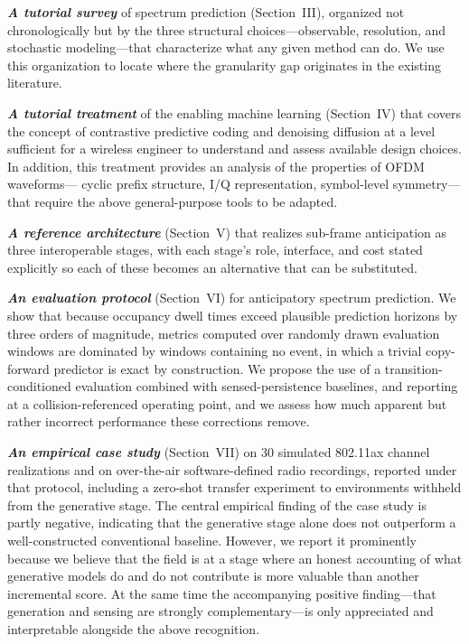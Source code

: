 \documentclass[lettersize,journal]{IEEEtran}
\begin{document}
\textbf{\emph{A tutorial survey}} of spectrum prediction
(Section~III), organized not chronologically but by the three
structural choices---observable, resolution, and stochastic
modeling---that characterize what any given method can do. We use this
organization to locate where the granularity gap originates
in the existing literature.

\textbf{\emph{A tutorial treatment}} of the enabling machine learning
(Section~IV) that covers the concept of contrastive predictive coding 
and denoising
diffusion at a level sufficient for a wireless engineer to understand 
and assess available
design choices. In addition, this treatment provides an analysis 
of the properties of OFDM waveforms---
cyclic prefix structure, I/Q representation, symbol-level
symmetry---that require the above general-purpose tools to be adapted.

\textbf{\emph{A reference architecture}} (Section~V) that realizes
sub-frame anticipation as three interoperable stages, with each stage's
role, interface, and cost stated explicitly so each of these becomes an
alternative that can be substituted.

\textbf{\emph{An evaluation protocol}} (Section~VI) for
anticipatory spectrum prediction. We show that because occupancy dwell
times exceed plausible prediction horizons by three orders of magnitude,
metrics computed over randomly drawn evaluation windows are dominated by
windows containing no event, in which a trivial copy-forward predictor
is exact by construction. We propose the use of a transition-conditioned
evaluation combined with sensed-persistence baselines, and reporting at a
collision-referenced operating point, and we assess how much
apparent but rather incorrect performance these corrections remove.

\textbf{\emph{An empirical case study}} (Section~VII) on 30 simulated
802.11ax channel realizations and on over-the-air software-defined radio
recordings, reported under that protocol, including a zero-shot transfer
experiment to environments withheld from the generative stage.
The central empirical finding of
the case study is partly negative, indicating that the generative 
stage alone does not outperform a well-constructed conventional 
baseline. However, we report it prominently because we believe that 
the field is at a stage where an honest accounting of what generative 
models do and do not contribute is more valuable than another 
incremental score. At the same time the accompanying
positive finding---that generation and sensing are strongly
complementary---is only appreciated and interpretable alongside 
the above recognition.
\end{document}
